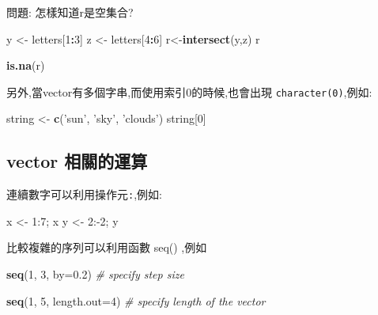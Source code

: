 \documentclass[]{book}
\newenvironment{Shaded}{\begin{snugshade}}{\end{snugshade}}
\newcommand{\CommentTok}[1]{\textcolor[rgb]{0.56,0.35,0.01}{\textit{#1}}}
\newcommand{\DataTypeTok}[1]{\textcolor[rgb]{0.13,0.29,0.53}{#1}}
\newcommand{\DecValTok}[1]{\textcolor[rgb]{0.00,0.00,0.81}{#1}}
\newcommand{\FloatTok}[1]{\textcolor[rgb]{0.00,0.00,0.81}{#1}}
\newcommand{\KeywordTok}[1]{\textcolor[rgb]{0.13,0.29,0.53}{\textbf{#1}}}
\newcommand{\NormalTok}[1]{#1}
\newcommand{\OperatorTok}[1]{\textcolor[rgb]{0.81,0.36,0.00}{\textbf{#1}}}
\newcommand{\StringTok}[1]{\textcolor[rgb]{0.31,0.60,0.02}{#1}}
\theoremstyle{definition}
\theoremstyle{definition}
\theoremstyle{definition}
\theoremstyle{remark}
\begin{document}
問題: 怎樣知道r是空集合?

\begin{Shaded}
\begin{Highlighting}[]
\NormalTok{y <-}\StringTok{ }\NormalTok{letters[}\DecValTok{1}\OperatorTok{:}\DecValTok{3}\NormalTok{] }
\NormalTok{z <-}\StringTok{ }\NormalTok{letters[}\DecValTok{4}\OperatorTok{:}\DecValTok{6}\NormalTok{] }
\NormalTok{r<-}\KeywordTok{intersect}\NormalTok{(y,z) }
\NormalTok{r}
\end{Highlighting}
\end{Shaded}

\begin{Shaded}
\begin{Highlighting}[]
\KeywordTok{is.na}\NormalTok{(r)}
\end{Highlighting}
\end{Shaded}

另外,當vector有多個字串,而使用索引0的時候,也會出現
\texttt{character(0)},例如:

\begin{Shaded}
\begin{Highlighting}[]
\NormalTok{string <-}\StringTok{ }\KeywordTok{c}\NormalTok{(}\StringTok{'sun'}\NormalTok{, }\StringTok{'sky'}\NormalTok{, }\StringTok{'clouds'}\NormalTok{)}
\NormalTok{string[}\DecValTok{0}\NormalTok{]}
\end{Highlighting}
\end{Shaded}

\hypertarget{vector-}{%
\subsection{vector 相關的運算}\label{vector-}}

連續數字可以利用操作元\texttt{:},例如:

x \textless{}- 1:7; x y \textless{}- 2:-2; y

比較複雜的序列可以利用函數 seq() ,例如

\begin{Shaded}
\begin{Highlighting}[]
\KeywordTok{seq}\NormalTok{(}\DecValTok{1}\NormalTok{, }\DecValTok{3}\NormalTok{, }\DataTypeTok{by=}\FloatTok{0.2}\NormalTok{)          }\CommentTok{# specify step size}
\end{Highlighting}
\end{Shaded}

\begin{Shaded}
\begin{Highlighting}[]
 \KeywordTok{seq}\NormalTok{(}\DecValTok{1}\NormalTok{, }\DecValTok{5}\NormalTok{, }\DataTypeTok{length.out=}\DecValTok{4}\NormalTok{)    }\CommentTok{# specify length of the vector}
\end{Highlighting}
\end{Shaded}
\end{document}
